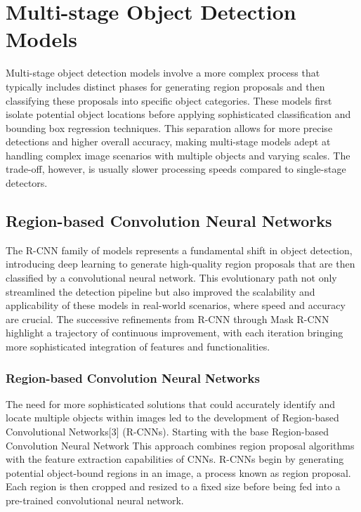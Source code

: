 \section{Multi-stage Object Detection Models}

Multi-stage object detection models involve a more complex process that typically includes distinct phases for generating region proposals and then classifying 
these proposals into specific object categories. These models first isolate potential object locations before applying sophisticated classification and 
bounding box regression techniques. This separation allows for more precise detections and higher overall accuracy, making multi-stage models adept at 
handling complex image scenarios with multiple objects and varying scales. The trade-off, however, is usually slower processing speeds compared to 
single-stage detectors.

\subsection{Region-based Convolution Neural Networks}

The R-CNN family of models represents a fundamental shift in object detection, introducing deep learning to generate high-quality region proposals 
that are then classified by a convolutional neural network. This evolutionary path not only streamlined the detection pipeline but also improved the 
scalability and applicability of these models in real-world scenarios, where speed and accuracy are crucial. The successive refinements from R-CNN 
through Mask R-CNN highlight a trajectory of continuous improvement, with  each iteration bringing more sophisticated integration of features and functionalities.


\subsubsection{Region-based Convolution Neural Networks}

The need for more sophisticated solutions that could accurately identify and locate multiple objects within images led to the development of 
Region-based Convolutional Networks[3] (R-CNNs). Starting with the base Region-based Convolution Neural Network This approach combines region proposal 
algorithms with the feature extraction capabilities of CNNs. R-CNNs begin by generating potential object-bound regions in an image, a process known 
as region proposal. Each region is then cropped and resized to a fixed size before being fed into a pre-trained convolutional neural network. 

